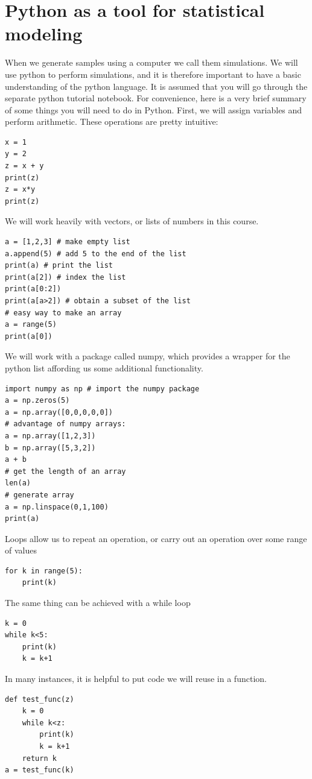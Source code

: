 \section{Python as a tool for statistical modeling}
When we generate samples using a computer we call them {\dfn simulations}. We will use python to perform simulations, and it is therefore important to have a basic understanding of the python language. It is assumed that you will go through the separate python tutorial notebook. For convenience, here is a very brief summary of some things you will need to do in Python. 
First, we will assign variables and perform arithmetic. These operations are pretty intuitive: 
\begin{Verbatim}
x = 1
y = 2
z = x + y
print(z)
z = x*y 
print(z)
\end{Verbatim}
We will work heavily with vectors, or lists of numbers in this course. 
\begin{Verbatim}
a = [1,2,3] # make empty list
a.append(5) # add 5 to the end of the list
print(a) # print the list
print(a[2])	# index the list
print(a[0:2])	
print(a[a>2]) # obtain a subset of the list
# easy way to make an array
a = range(5)
print(a[0])
\end{Verbatim}
We will work with a package called numpy, which provides a wrapper for the python list affording us some additional functionality. 
\begin{Verbatim}
import numpy as np # import the numpy package
a = np.zeros(5)
a = np.array([0,0,0,0,0])
# advantage of numpy arrays:
a = np.array([1,2,3])
b = np.array([5,3,2])
a + b
# get the length of an array 
len(a)
# generate array 
a = np.linspace(0,1,100)
print(a)
\end{Verbatim}
Loops allow us to repeat an operation, or carry out an operation over some range of values
\begin{Verbatim}
for k in range(5):
	print(k)	
\end{Verbatim}
The same thing can be achieved with a while loop 
\begin{Verbatim}
k = 0
while k<5: 
	print(k)
	k = k+1
\end{Verbatim}

In many instances, it is helpful to put code we will reuse in a function. 
\begin{Verbatim}
def test_func(z)
	k = 0
	while k<z: 
		print(k)
		k = k+1
 	return k
a = test_func(k)
\end{Verbatim}


